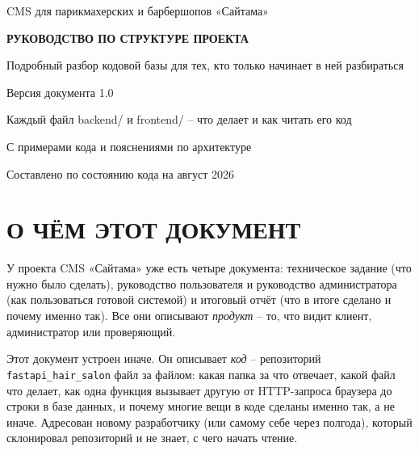 



\begin{titlepage}
\centering
\vspace*{1.5cm}
{\large CMS для парикмахерских и барбершопов «Сайтама»\par}
\vspace{3cm}
{\Huge\bfseries РУКОВОДСТВО ПО СТРУКТУРЕ ПРОЕКТА\par}
\vspace{1.2em}
{\Large Подробный разбор кодовой базы для тех, кто только начинает в ней разбираться\par}
\vspace{0.6em}
{\large Версия документа 1.0\par}
\vfill
{\large Каждый файл backend/ и frontend/ -- что делает и как читать его код\par}
\vspace{0.4em}
{\large С примерами кода и пояснениями по архитектуре\par}
\vfill
Составлено по состоянию кода на август 2026\par
\vspace{1cm}
\end{titlepage}

\section*{О ЧЁМ ЭТОТ ДОКУМЕНТ}

У проекта CMS «Сайтама» уже есть четыре документа: техническое задание
(что нужно было сделать), руководство пользователя и руководство
администратора (как пользоваться готовой системой) и итоговый отчёт
(что в итоге сделано и почему именно так). Все они описывают
\emph{продукт} -- то, что видит клиент, администратор или проверяющий.

Этот документ устроен иначе. Он описывает \emph{код} -- репозиторий
\texttt{fastapi_hair_salon} файл за файлом: какая папка за что отвечает,
какой файл что делает, как одна функция вызывает другую от HTTP-запроса
браузера до строки в базе данных, и почему многие вещи в коде сделаны
именно так, а не иначе. Адресован новому разработчику (или самому себе
через полгода), который склонировал репозиторий и не знает, с чего
начать чтение.

